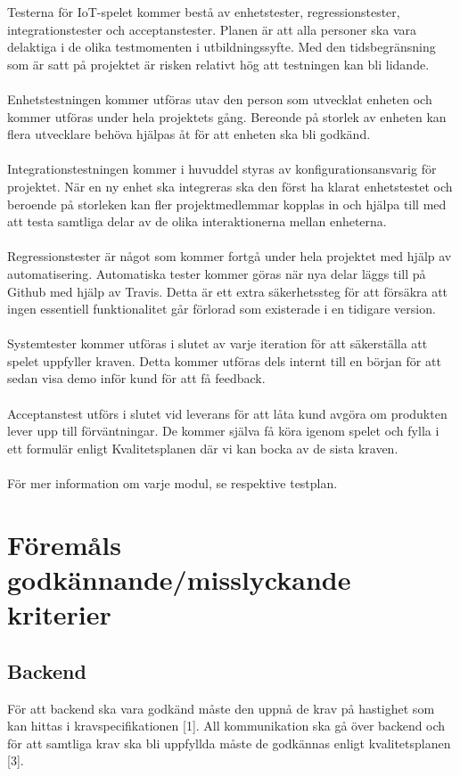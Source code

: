 \documentclass[10pt]{article}
\begin{document}
	Testerna för IoT-spelet kommer bestå av enhetstester, regressionstester, integrationstester och acceptanstester. Planen är att alla personer ska vara delaktiga i de olika 		testmomenten i utbildningssyfte. Med den tidsbegränsning som är satt på projektet är risken relativt hög att testningen kan bli lidande. \\
	\\
	Enhetstestningen kommer utföras utav den person som utvecklat enheten och kommer utföras under hela projektets gång. Bereonde på storlek av enheten kan flera utvecklare behöva hjälpas åt för att enheten ska bli godkänd.\\
	\\
	Integrationstestningen kommer i huvuddel styras av konfigurationsansvarig för projektet. När en ny enhet ska integreras ska den först ha klarat enhetstestet och beroende på storleken kan fler projektmedlemmar kopplas in och hjälpa till med att testa samtliga delar av de olika interaktionerna mellan enheterna. \\
	\\
	Regressionstester är något som kommer fortgå under hela projektet med hjälp av automatisering. Automatiska tester kommer göras när nya delar läggs till på Github med hjälp av {\color{red}Travis}. Detta är ett extra säkerhetssteg för att försäkra att ingen essentiell funktionalitet går förlorad som existerade i en tidigare version.\\
	\\
	Systemtester kommer utföras i slutet av varje iteration för att säkerställa att spelet uppfyller kraven. Detta kommer utföras dels internt till en början för att sedan visa demo inför kund för att få feedback.  \\ 
	\\
	Acceptanstest utförs i slutet vid leverans för att låta kund avgöra om produkten lever upp till förväntningar. De kommer själva få köra igenom spelet och fylla i ett formulär enligt Kvalitetsplanen där vi kan bocka av de sista kraven. \\
	\\
	För mer information om varje modul, se respektive testplan.
	
	

\section{Föremåls godkännande/misslyckande kriterier}
	\subsection{Backend}
		För att backend ska vara godkänd måste den uppnå de krav på hastighet som kan hittas i kravspecifikationen {\color{red}[1]}. All kommunikation ska gå över backend och för att samtliga krav ska bli uppfyllda måste de godkännas enligt kvalitetsplanen  {\color{red}[3]}.
\end{document}
